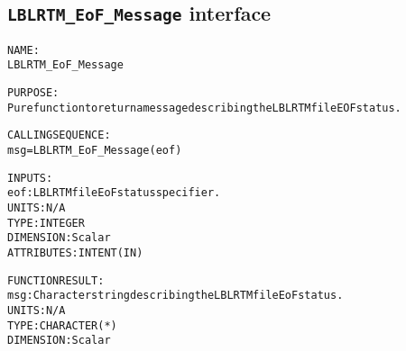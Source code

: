 \subsection{\texttt{LBLRTM\_EoF\_Message} interface}
  \label{sec:LBLRTM_EoF_Message_interface}
  \begin{alltt}
 
  NAME:
        LBLRTM_EoF_Message
 
  PURPOSE:
        Pure function to return a message describing the LBLRTM file EOF status.
 
  CALLING SEQUENCE:
        msg = LBLRTM_EoF_Message( eof )
 
  INPUTS:
        eof:       LBLRTM file EoF status specifier.
                   UNITS:      N/A
                   TYPE:       INTEGER
                   DIMENSION:  Scalar
                   ATTRIBUTES: INTENT(IN)
 
  FUNCTION RESULT:
        msg:       Character string describing the LBLRTM file EoF status.
                   UNITS:      N/A
                   TYPE:       CHARACTER(*)
                   DIMENSION:  Scalar
 
  \end{alltt}

